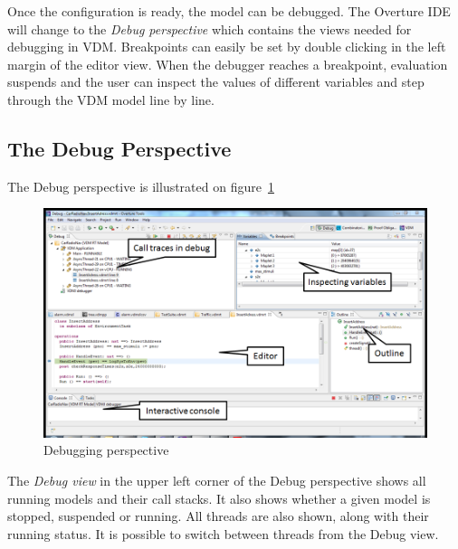 Once the configuration is ready, the model can be debugged. The
Overture IDE will change to the \emph{Debug perspective} which
contains the views needed for debugging in VDM. Breakpoints can easily
be set by double clicking in the left margin of the editor view. When
the debugger reaches a breakpoint, evaluation suspends and the user
can inspect the values of different variables and step through the VDM
model line by line.
 
\subsection{The Debug Perspective}

The Debug perspective is illustrated on figure~\ref{fig:userguide:DebuggingVDM}
\begin{figure}[htp]
\begin{center}
  \includegraphics[width=4.5in]{figures/DebuggingVDMRT}
  \caption[Debugging perspective]{Debugging perspective}
  \label{fig:userguide:DebuggingVDM}
\end{center}
\end{figure}
The \emph{Debug view} in the upper left corner of the Debug
perspective shows all running models and their call stacks. It also
shows whether a given model is stopped, suspended or running. All
threads are also shown, along with their running status. It is
possible to switch between threads from the Debug view.

